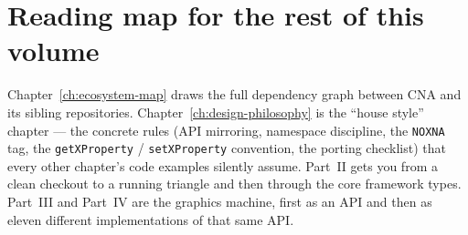 \section{Reading map for the rest of this volume}

Chapter~\ref{ch:ecosystem-map} draws the full dependency graph between CNA and its sibling
repositories. Chapter~\ref{ch:design-philosophy} is the ``house style'' chapter --- the
concrete rules (API mirroring, namespace discipline, the \texttt{NOXNA} tag, the
\texttt{getXProperty} / \texttt{setXProperty} convention, the porting checklist) that every
other chapter's code examples silently assume. Part~II gets you from a clean checkout to a
running triangle and then through the core framework types. Part~III and Part~IV are the
graphics machine, first as an API and then as eleven different implementations of that same
API.
